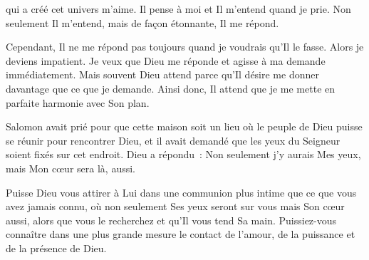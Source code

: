 


 qui a créé cet univers m'aime.
 Il pense à moi et Il m'entend quand je prie.
 Non seulement Il m'entend, mais de façon étonnante, Il me répond.

Cependant, Il ne me répond pas toujours quand je voudrais qu'Il le fasse.
 Alors je deviens impatient. Je veux que Dieu me réponde
 et agisse à ma demande immédiatement.
 Mais souvent Dieu attend parce qu'Il désire me donner davantage
 que ce que je demande.
 Ainsi donc, Il attend que je me mette en parfaite harmonie avec Son plan. 

Salomon avait prié pour que cette maison soit un lieu où le peuple de Dieu
 puisse se réunir pour rencontrer Dieu, et il avait demandé
 que les yeux du Seigneur soient fixés sur cet endroit.
 Dieu a répondu~:
 \og Non seulement j'y aurais Mes yeux,
 mais Mon c\oe{}ur sera là, aussi. \fg{}


Puisse Dieu vous attirer à Lui dans une communion plus intime
 que ce que vous avez jamais connu, où non seulement Ses yeux seront sur vous
 mais Son c\oe{}ur aussi, alors que vous le recherchez
 et qu'Il vous tend Sa main.
 Puissiez-vous connaître dans une plus grande mesure le contact de l'amour,
 de la puissance et de la présence de Dieu. 

\dvrule






